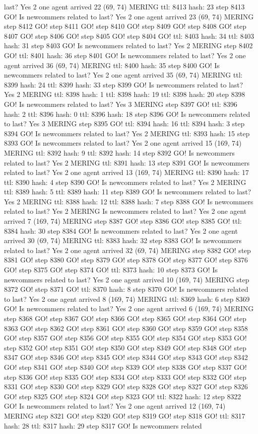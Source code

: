 last? Yes 2 one agent arrived 22 (69, 74) MERING ttl: 8413 hash: 23 step 8413 GO! Is newcommers related to last? Yes 2 one agent arrived 23 (69, 74) MERING step 8412 GO! step 8411 GO! step 8410 GO! step 8409 GO! step 8408 GO! step 8407 GO! step 8406 GO! step 8405 GO! step 8404 GO! ttl: 8403 hash: 34 ttl: 8403 hash: 31 step 8403 GO! Is newcommers related to last? Yes 2 MERING step 8402 GO! ttl: 8401 hash: 36 step 8401 GO! Is newcommers related to last? Yes 2 one agent arrived 36 (69, 74) MERING ttl: 8400 hash: 35 step 8400 GO! Is newcommers related to last? Yes 2 one agent arrived 35 (69, 74) MERING ttl: 8399 hash: 24 ttl: 8399 hash: 33 step 8399 GO! Is newcommers related to last? Yes 2 MERING ttl: 8398 hash: 1 ttl: 8398 hash: 19 ttl: 8398 hash: 20 step 8398 GO! Is newcommers related to last? Yes 3 MERING step 8397 GO! ttl: 8396 hash: 2 ttl: 8396 hash: 0 ttl: 8396 hash: 18 step 8396 GO! Is newcommers related to last? Yes 3 MERING step 8395 GO! ttl: 8394 hash: 16 ttl: 8394 hash: 3 step 8394 GO! Is newcommers related to last? Yes 2 MERING ttl: 8393 hash: 15 step 8393 GO! Is newcommers related to last? Yes 2 one agent arrived 15 (169, 74) MERING ttl: 8392 hash: 9 ttl: 8392 hash: 14 step 8392 GO! Is newcommers related to last? Yes 2 MERING ttl: 8391 hash: 13 step 8391 GO! Is newcommers related to last? Yes 2 one agent arrived 13 (169, 74) MERING ttl: 8390 hash: 17 ttl: 8390 hash: 4 step 8390 GO! Is newcommers related to last? Yes 2 MERING ttl: 8389 hash: 5 ttl: 8389 hash: 11 step 8389 GO! Is newcommers related to last? Yes 2 MERING ttl: 8388 hash: 12 ttl: 8388 hash: 7 step 8388 GO! Is newcommers related to last? Yes 2 MERING Is newcommers related to last? Yes 2 one agent arrived 7 (169, 74) MERING step 8387 GO! step 8386 GO! step 8385 GO! ttl: 8384 hash: 30 step 8384 GO! Is newcommers related to last? Yes 2 one agent arrived 30 (69, 74) MERING ttl: 8383 hash: 32 step 8383 GO! Is newcommers related to last? Yes 2 one agent arrived 32 (69, 74) MERING step 8382 GO! step 8381 GO! step 8380 GO! step 8379 GO! step 8378 GO! step 8377 GO! step 8376 GO! step 8375 GO! step 8374 GO! ttl: 8373 hash: 10 step 8373 GO! Is newcommers related to last? Yes 2 one agent arrived 10 (169, 74) MERING step 8372 GO! step 8371 GO! ttl: 8370 hash: 8 step 8370 GO! Is newcommers related to last? Yes 2 one agent arrived 8 (169, 74) MERING ttl: 8369 hash: 6 step 8369 GO! Is newcommers related to last? Yes 2 one agent arrived 6 (169, 74) MERING step 8368 GO! step 8367 GO! step 8366 GO! step 8365 GO! step 8364 GO! step 8363 GO! step 8362 GO! step 8361 GO! step 8360 GO! step 8359 GO! step 8358 GO! step 8357 GO! step 8356 GO! step 8355 GO! step 8354 GO! step 8353 GO! step 8352 GO! step 8351 GO! step 8350 GO! step 8349 GO! step 8348 GO! step 8347 GO! step 8346 GO! step 8345 GO! step 8344 GO! step 8343 GO! step 8342 GO! step 8341 GO! step 8340 GO! step 8339 GO! step 8338 GO! step 8337 GO! step 8336 GO! step 8335 GO! step 8334 GO! step 8333 GO! step 8332 GO! step 8331 GO! step 8330 GO! step 8329 GO! step 8328 GO! step 8327 GO! step 8326 GO! step 8325 GO! step 8324 GO! step 8323 GO! ttl: 8322 hash: 12 step 8322 GO! Is newcommers related to last? Yes 2 one agent arrived 12 (169, 74) MERING step 8321 GO! step 8320 GO! step 8319 GO! step 8318 GO! ttl: 8317 hash: 28 ttl: 8317 hash: 29 step 8317 GO! Is newcommers related 